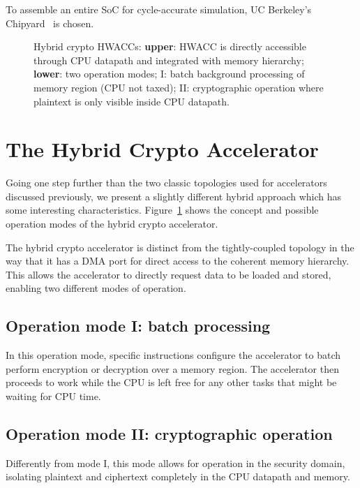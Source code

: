 \documentclass[10pt,conference]{IEEEtran}
\begin{document}
To assemble an entire SoC for cycle-accurate simulation, UC Berkeley's Chipyard~\cite{Chipyard}
is chosen.

\begin{figure}
  \centering
  \caption{Hybrid crypto HWACCs: \textbf{upper}: HWACC is directly accessible through CPU datapath and
    integrated with memory hierarchy; \textbf{lower}: two operation modes; I: batch
    background processing of memory region (CPU not taxed); II: cryptographic
    operation where plaintext is only visible inside CPU datapath.}
  \label{fig:hybrid}
\end{figure}

\section{The Hybrid Crypto Accelerator}

Going one step further than the two classic topologies used for accelerators
discussed previously, we present a slightly different hybrid approach which has
some interesting characteristics. Figure~\ref{fig:hybrid} shows the concept and
possible operation modes of the hybrid crypto accelerator.

The hybrid crypto accelerator is distinct from the tightly-coupled topology in
the way that it has a DMA port for direct access to the coherent memory
hierarchy. This allows the accelerator to directly request data to be loaded and
stored, enabling two different modes of operation.

\subsection{Operation mode I: batch processing}

In this operation mode, specific instructions configure the accelerator to
batch perform encryption or decryption over a memory region. The accelerator
then proceeds to work while the CPU is left free for any other tasks that might
be waiting for CPU time.


\subsection{Operation mode II: cryptographic operation}

Differently from mode I, this mode allows for operation in the security domain,
isolating plaintext and ciphertext completely in the CPU datapath and memory.
\end{document}
